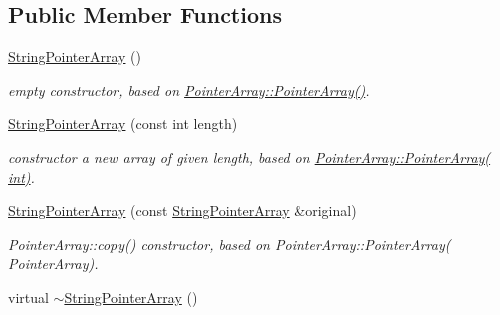 \subsection*{Public Member Functions}
\begin{DoxyCompactItemize}
\item 
\hypertarget{classparray_1_1StringPointerArray_a3dcc569f7833b31b26bb72570bdc7067}{\hyperlink{classparray_1_1StringPointerArray_a3dcc569f7833b31b26bb72570bdc7067}{String\-Pointer\-Array} ()}\label{classparray_1_1StringPointerArray_a3dcc569f7833b31b26bb72570bdc7067}

\begin{DoxyCompactList}\small\item\em empty constructor, based on \hyperlink{classparray_1_1PointerArray_ab506b284822d1e013813579e06893797}{Pointer\-Array\-::\-Pointer\-Array()}. \end{DoxyCompactList}\item 
\hypertarget{classparray_1_1StringPointerArray_ae31ac6c33c13c602d3cbee3ca4aed10c}{\hyperlink{classparray_1_1StringPointerArray_ae31ac6c33c13c602d3cbee3ca4aed10c}{String\-Pointer\-Array} (const int length)}\label{classparray_1_1StringPointerArray_ae31ac6c33c13c602d3cbee3ca4aed10c}

\begin{DoxyCompactList}\small\item\em constructor a new array of given length, based on \hyperlink{classparray_1_1PointerArray_a4e39d7adf15e94c02dfe2662c181f0c6}{Pointer\-Array\-::\-Pointer\-Array( int)}. \end{DoxyCompactList}\item 
\hypertarget{classparray_1_1StringPointerArray_a6566d7032d0c519b440220df77651345}{\hyperlink{classparray_1_1StringPointerArray_a6566d7032d0c519b440220df77651345}{String\-Pointer\-Array} (const \hyperlink{classparray_1_1StringPointerArray}{String\-Pointer\-Array} \&original)}\label{classparray_1_1StringPointerArray_a6566d7032d0c519b440220df77651345}

\begin{DoxyCompactList}\small\item\em Pointer\-Array\-::copy() constructor, based on Pointer\-Array\-::\-Pointer\-Array( Pointer\-Array). \end{DoxyCompactList}\item 
\hypertarget{classparray_1_1StringPointerArray_a66e413fa7aedbfe9b45c87d8641ea36e}{virtual \hyperlink{classparray_1_1StringPointerArray_a66e413fa7aedbfe9b45c87d8641ea36e}{$\sim$\-String\-Pointer\-Array} ()}\label{classparray_1_1StringPointerArray_a66e413fa7aedbfe9b45c87d8641ea36e}


\end{DoxyCompactItemize}
